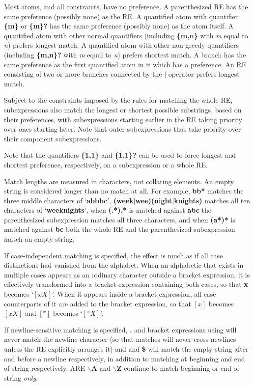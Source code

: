 Most atoms, and all constraints, have no preference.
A parenthesized RE has the same preference (possibly none) as the RE. A
quantified atom with quantifier {\bf \{m\}} or {\bf \{m\}?} has the same preference (possibly
none) as the atom itself. A quantified atom with other normal quantifiers
(including {\bf \{m,n\}} with {\it m} equal to {\it n}) prefers longest match. A quantified
atom with other non-greedy quantifiers (including {\bf \{m,n\}?} with {\it m} equal to
 {\it n}) prefers shortest match. A branch has the same preference as the first
quantified atom in it which has a preference. An RE consisting of two or
more branches connected by the {\bf $|$} operator prefers longest match. 

Subject to the constraints imposed by the rules for matching the whole RE, subexpressions
also match the longest or shortest possible substrings, based on their
preferences, with subexpressions starting earlier in the RE taking priority
over ones starting later. Note that outer subexpressions thus take priority
over their component subexpressions. 

Note that the quantifiers {\bf \{1,1\}} and
 {\bf \{1,1\}?} can be used to force longest and shortest preference, respectively,
on a subexpression or a whole RE. 

Match lengths are measured in characters,
not collating elements. An empty string is considered longer than no match
at all. For example, {\bf bb*} matches the three middle characters
of `{\bf abbbc}', {\bf (week$|$wee)(night$|$knights)}
matches all ten characters of `{\bf weeknights}', when {\bf (.*).*} is matched against
 {\bf abc} the parenthesized subexpression matches all three characters, and when
 {\bf (a*)*} is matched against {\bf bc} both the whole RE and the parenthesized subexpression
match an empty string. 

If case-independent matching is specified, the effect
is much as if all case distinctions had vanished from the alphabet. When
an alphabetic that exists in multiple cases appears as an ordinary character
outside a bracket expression, it is effectively transformed into a bracket
expression containing both cases, so that {\bf x} becomes `{\bf $[xX]$}'. When it appears
inside a bracket expression, all case counterparts of it are added to the
bracket expression, so that {\bf $[x]$} becomes {\bf $[xX]$} and {\bf $[^x]$} becomes `{\bf $[^xX]$}'. 

If newline-sensitive
matching is specified, {\bf .} and bracket expressions using {\bf \caret} will never match
the newline character (so that matches will never cross newlines unless
the RE explicitly arranges it) and {\bf \caret} and {\bf \$} will match the empty string after
and before a newline respectively, in addition to matching at beginning
and end of string respectively. ARE {\bf $\backslash$A} and {\bf $\backslash$Z} continue to match beginning
or end of string {\it only}. 

